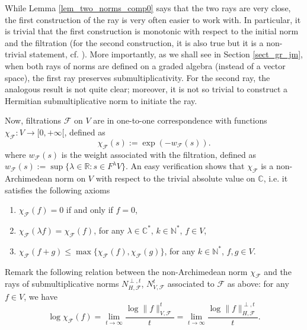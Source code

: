 \documentclass[12pt]{article}
\numberwithin{equation}{section}
\theoremstyle{theorem}
\theoremstyle{definition}
\theoremstyle{remark}
\newcommand{\comp}{\mathbb{C}}
\newcommand{\real}{\mathbb{R}}
\newcommand{\nat}{\mathbb{N}}
\begin{document}
	While Lemma \ref{lem_two_norms_comp0} says that the two rays are very close, the first construction of the ray is very often easier to work with.
	In particular, it is trivial that the first construction is monotonic with respect to the initial norm and the filtration (for the second construction, it is also true but it is a non-trivial statement, cf. \cite[Proposition 4.12]{FinTits}).
	More importantly, as we shall see in Section \ref{sect_gr_jm}, when both rays of norms are defined on a graded algebra (instead of a vector space), the first ray preserves submultiplicativity. 
	For the second ray, the analogous result is not quite clear; moreover, it is not so trivial to construct a Hermitian submultiplicative norm to initiate the ray.
	\par 
	Now, filtrations $\mathcal{F}$ on $V$ are in one-to-one correspondence with functions $\chi_{\mathcal{F}} : V \to [0, +\infty[$, defined as
	\begin{equation}\label{eq_filtr_norm}
		\chi_{\mathcal{F}}(s) := \exp(- w_{\mathcal{F}}(s)).
	\end{equation}
	where $w_{\mathcal{F}}(s)$ is the weight associated with the filtration, defined as
	$
		w_{\mathcal{F}}(s) := \sup \{ \lambda \in \real : s \in F^{\lambda} V \}
	$.
	An easy verification shows that $\chi_{\mathcal{F}}$ is a non-Archimedean norm on $V$ with respect to the trivial absolute value on $\comp$, i.e. it satisfies the following axioms
	\begin{enumerate}
		\item $\chi_{\mathcal{F}}(f) = 0$ if and only if $f = 0$,
		\item $\chi_{\mathcal{F}}(\lambda f) = \chi_{\mathcal{F}}(f)$, for any $\lambda \in \comp^*$, $k \in \nat^*$, $f \in V$,
		\item $\chi_{\mathcal{F}}(f + g) \leq \max \{ \chi_{\mathcal{F}}(f), \chi_{\mathcal{F}}(g) \}$, for any $k \in \nat^*$, $f, g \in V$.
	\end{enumerate}
	\par 
	Remark the following relation between the non-Archimedean norm $\chi_{\mathcal{F}}$ and the rays of submultiplicative norms $N_{H, \mathcal{F}}^{\perp, t}$, $ N_{V, \mathcal{F}}^t$ associated to $\mathcal{F}$ as above: for any $f \in V$, we have
	\begin{equation}\label{eq_na_nm_interpol}
		\log \chi_{\mathcal{F}}(f) 
		=
		 \lim_{t \to \infty} \frac{\log \| f \|_{V, \mathcal{F}}^{t}}{t} 
		=
		\lim_{t \to \infty} \frac{\log \| f \|_{H, \mathcal{F}}^{\perp, t}}{t}.
	\end{equation}
\end{document}
